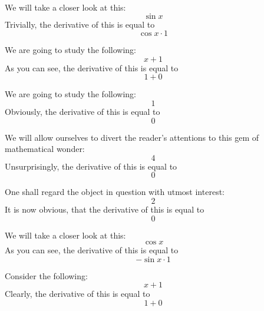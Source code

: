 \documentclass{article}
\begin{document}
We will take a closer look at this:
\begin{equation}
\sin x 
\end{equation}
Trivially, the derivative of this is equal to
\begin{equation}
\cos x \cdot 1 
\end{equation}

We are going to study the following:
\begin{equation}
x + 1 
\end{equation}
As you can see, the derivative of this is equal to
\begin{equation}
1 + 0 
\end{equation}

We are going to study the following:
\begin{equation}
1 
\end{equation}
Obviously, the derivative of this is equal to
\begin{equation}
0 
\end{equation}

We will allow ourselves to divert the reader's attentions to this gem of mathematical wonder:
\begin{equation}
4 
\end{equation}
Unsurprisingly, the derivative of this is equal to
\begin{equation}
0 
\end{equation}

One shall regard the object in question with utmost interest:
\begin{equation}
2 
\end{equation}
It is now obvious, that the derivative of this is equal to
\begin{equation}
0 
\end{equation}

We will take a closer look at this:
\begin{equation}
\cos x 
\end{equation}
As you can see, the derivative of this is equal to
\begin{equation}
-\sin x \cdot 1 
\end{equation}

Consider the following:
\begin{equation}
x + 1 
\end{equation}
Clearly, the derivative of this is equal to
\begin{equation}
1 + 0 
\end{equation}
\end{document}
